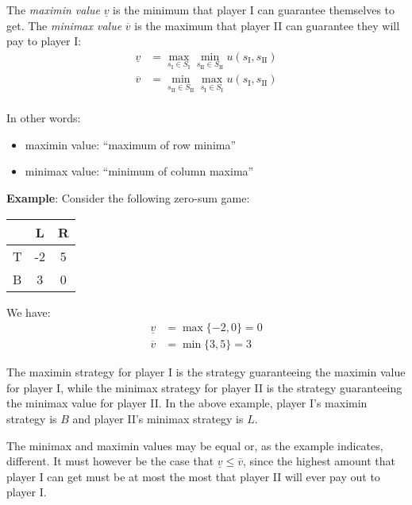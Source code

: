 \begin{definition}
	The \emph{maximin value} $\underline{v}$ is the minimum that player I can
	guarantee themselves to get. The \emph{minimax value} $\overline{v}$ is the
	maximum that player II can guarantee they will pay to player I:
	\begin{equation}
		\begin{split}
			\underline{v} & = \max_{s_\text{I} \in S_\text{I}} \min_{s_\text{II}
			\in S_\text{II}} u(s_\text{I}, s_\text{II}) \\
			\overline{v} & = \min_{s_\text{II} \in S_\text{II}} \max_{s_\text{I}
			\in S_\text{I}} u(s_\text{I}, s_\text{II}) \\
		\end{split}
	\end{equation}
\end{definition}

In other words:
\begin{itemize}
	\item maximin value: ``maximum of row minima''
	\item minimax value: ``minimum of column maxima''
\end{itemize}

\textbf{Example}: Consider the following zero-sum game:
\begin{center}
	\begin{tabular}{c|cc}
		& L & R \\ \hline
		T & -2 & 5 \\
		B & 3 & 0 \\
	\end{tabular}
\end{center}

We have:
\begin{equation*}
	\begin{split}
		\underline{v} & = \max \{-2,0\} = 0 \\
		\overline{v} & = \min \{3,5\} = 3
	\end{split}
\end{equation*}

The maximin strategy for player I is the strategy guaranteeing the maximin
value for player I, while the minimax strategy for player II is the strategy
guaranteeing the minimax value for player II. In the above example, player I's
maximin strategy is $B$ and player II's minimax strategy is $L$.

The minimax and maximin values may be equal or, as the example indicates,
different. It must however be the case that $\underline{v} \le \overline{v}$,
since the highest amount that player I can get must be at most the most that
player II will ever pay out to player I.

